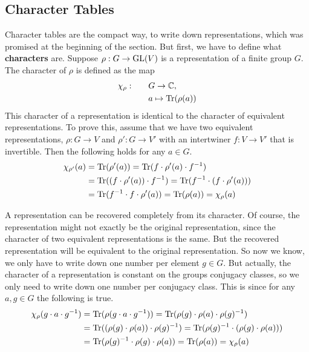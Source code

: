 \subsection{Character Tables}

Character tables are the compact way, to write down representations, which was promised at the beginning of the section.
But first, we have to define what \textbf{characters} are.
Suppose $\rho: G \to \operatorname{GL}(V)$ is a representation of a finite group $G$.
The character of $\rho$ is defined as the map
\begin{subequations}
    \begin{align}
        \chi_\rho: \qquad & G \to \mathbb{C}, \\
        & a \mapsto \operatorname{Tr}(\rho(a))
    \end{align}
\end{subequations}
This character of a representation is identical to the character of equivalent representations.
To prove this, assume that we have two equivalent representations, $\rho: G \to V$ and $\rho': G \to V'$ with an intertwiner $f: V \to V'$ that is invertible.
Then the following holds for any $a \in G$.
\begin{subequations}
\begin{align}
    \chi_{\rho'}(a) & = \operatorname{Tr}(\rho'(a)) = \operatorname{Tr}(f \cdot \rho'(a) \cdot f^{-1}) \\
    & = \operatorname{Tr}((f \cdot \rho'(a)) \cdot f^{-1}) = \operatorname{Tr}(f^{-1} \cdot (f \cdot \rho'(a))) \\
    & = \operatorname{Tr}(f^{-1} \cdot f \cdot \rho'(a) )= \operatorname{Tr}(\rho(a)) = \chi_\rho(a)
\end{align}
\end{subequations}

A representation can be recovered completely from its character.
Of course, the representation might not exactly be the original representation, since the character of two equivalent representations is the same.
But the recovered representation will be equivalent to the original representation.
So now we know, we only have to write down one number per element $g \in G$.
But actually, the character of a representation is constant on the groups conjugacy classes, so we only need to write down one number per conjugacy class.
This is since for any $a, g \in G$ the following is true.
\begin{subequations}
\begin{align}
    \chi_\rho(g \cdot a \cdot g^{-1}) & = \operatorname{Tr}(\rho(g \cdot a \cdot g^{-1})) = \operatorname{Tr}(\rho(g) \cdot \rho(a) \cdot \rho(g)^{-1}) \\
    & = \operatorname{Tr}((\rho(g) \cdot \rho(a)) \cdot \rho(g)^{-1}) = \operatorname{Tr}(\rho(g)^{-1} \cdot (\rho(g) \cdot \rho(a))) \\
    & = \operatorname{Tr}(\rho(g)^{-1} \cdot \rho(g) \cdot \rho(a)) = \operatorname{Tr}(\rho(a)) = \chi_\rho(a) \\
\end{align}
\end{subequations}

